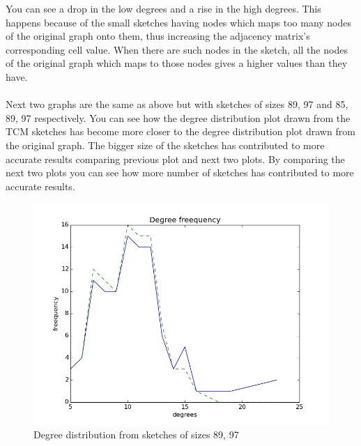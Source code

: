 \documentclass[12pt]{report}
\numberwithin{figure}{section}
\numberwithin{table}{section}
\begin{document}
You can see a drop in the low degrees and a rise in the high degrees. This happens because of the small sketches having nodes which maps too many nodes of the original graph onto them, thus increasing the adjacency matrix’s corresponding cell value. When there are such nodes in the sketch, all the nodes of the original graph which maps to those nodes gives a higher values than they have. 

\paragraph{}

Next two graphs are the same as above but with sketches  of sizes 89, 97 and 85, 89, 97 respectively. You can see how the degree distribution plot drawn from the TCM sketches has become more closer to the degree distribution plot drawn from the original graph. The bigger size of the sketches has contributed to more accurate results comparing previous plot and next two plots. By comparing the next two plots you can see how more number of sketches has contributed to more accurate results.

\begin{figure}[H]
\centering
\includegraphics[scale=0.6]{images/dd2}
\caption{Degree distribution from sketches of sizes 89, 97}
\end{figure}
\end{document}
